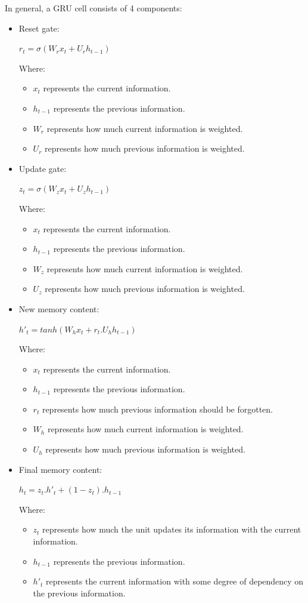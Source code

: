 \documentclass{ieeeojies}
\begin{document}
In general, a GRU cell consists of 4 components:
\begin{itemize}
	\item Reset gate:
	\newline \centerline{$r_{t} = \sigma(W_{r}x_{t} + U_{r}h_{t-1})$}
	\newline Where:
	\begin{itemize}
		\item $x_{t}$ represents the current information.
		\item $h_{t-1}$ represents the previous information.
		\item $W_{r}$ represents how much current information is weighted.
		\item $U_{r}$ represents how much previous information is weighted.
	\end{itemize}
	\item Update gate:
	\newline \centerline{$z_{t} = \sigma(W_{z}x_{t} + U_{z}h_{t-1})$}
	\newline Where:
	\begin{itemize}
		\item $x_{t}$ represents the current information.
		\item $h_{t-1}$ represents the previous information.
		\item $W_{z}$ represents how much current information is weighted.
		\item $U_{z}$ represents how much previous information is weighted.
	\end{itemize}
	\item New memory content:
	\newline \centerline{$h'_{t} =  tanh(W_{h}x_{t} + r_{t}.U_{h}h_{t-1})$}
	\newline Where:
	\begin{itemize}
		\item $x_{t}$ represents the current information.
		\item $h_{t-1}$ represents the previous information.
		\item $r_{t}$ represents how much previous information should be forgotten.
		\item $W_{h}$ represents how much current information is weighted.
		\item $U_{h}$ represents how much previous information is weighted.
	\end{itemize}
	\item Final memory content:
	\newline \centerline{$h_{t} =  z_{t}.h'_{t} + (1 - z_{t}).h_{t-1}$}
	\newline Where:
	\begin{itemize}
		\item $z_{t}$ represents how much the unit updates its information with the current information.
		\item $h_{t-1}$ represents the previous information.
		\item $h'_{t}$ represents the current information with some degree of dependency on the previous information.
	\end{itemize}
\end{itemize}
\EOD
\end{document}
